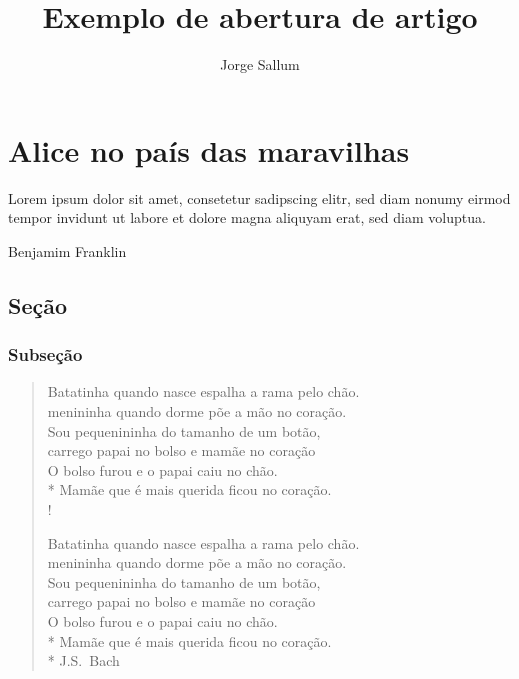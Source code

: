 \documentclass{memoir}
\title{Exemplo de abertura de artigo}
\author{Jorge Sallum}
\begin{document}
 

\maketitle
 

\setcounter{secnumdepth}{4} 
\tableofcontents



\chapter[Alice no país...]{Alice no país das maravilhas}

\epigraph{Lorem ipsum dolor sit amet, consetetur sadipscing elitr, sed diam nonumy eirmod tempor invidunt ut labore et dolore magna aliquyam erat, sed diam voluptua.}{Benjamim Franklin}

\section{Seção}
\lipsum[1]

\subsection{Subseção}

\begin{verse}
Batatinha quando nasce espalha a rama pelo chão.\\
menininha quando dorme põe a mão no coração.\\
Sou pequenininha do tamanho de um botão,\\
carrego papai no bolso e mamãe no coração\\
O bolso furou e o papai caiu no chão.\\*
Mamãe que é mais querida ficou no coração.\\!

Batatinha quando nasce espalha a rama pelo chão.\\
menininha quando dorme põe a mão no coração.\\
Sou pequenininha do tamanho de um botão,\\
carrego papai no bolso e mamãe no coração\\
O bolso furou e o papai caiu no chão.\\*
Mamãe que é mais querida ficou no coração.\\*
\nobreak\medskip
\hfill J.S.~Bach

\end{verse}
\lipsum[2]
\end{document}
